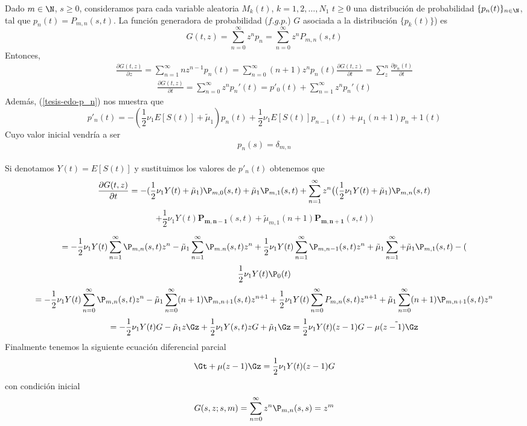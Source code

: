Dado $m\in\N$, $s\geq 0$, consideramos para cada variable aleatoria $M_k(t)$, $k=1,2,\ldots,N_1$ $t\geq 0$ una distribución de probabilidad $\{p_n(t)\}_{n\in\N}$, tal que $p_n(t)=P_{m,n}(s,t)$. La función generadora de probabilidad ($f.g.p.$) $G$ asociada a la distribución $\{p_k(t)\}$) es
\begin{equation}
    G(t,z)=\sum_{n=0}^\infty z^n p_n=\sum_{n=0}^\infty z^n P_{m,n}(s,t)\label{tesis-funcGeneradoraDeM}
\end{equation}
Entonces,
\begin{eqnarray}
    \frac{\partial G(t,z)}{\partial z}=\sum_{n=1}^\infty n z^{n-1}p_n(t)=\sum_{n=0}^\infty (n+1)z^{n}p_n(t)
    \frac{\partial G(t,z)}{\partial t} = \sum_z^n \frac{\partial p_n(t)}{\partial t}
\end{eqnarray}
\begin{eqnarray}
    \frac{\partial G(t,z)}{\partial t}=\sum_{n=0}^\infty z^n p_n'(t)=p'_0(t)+\sum_{n=1}^\infty z^n p_n'(t)
\end{eqnarray}
Además, (\ref{tesis-edo-p_n}) nos muestra que $$p'_n(t)=-(\frac{1}{2}\nu_1E[S(t)]+\tilde{\mu}_1)p_n(t)+\frac{1}{2}\nu_1E[S(t)]p_{n-1}(t)+\mu_1 (n+1)p_n+1(t)$$
Cuyo valor inicial vendría a ser $$p_n(s)=\delta_{m,n}$$\\
Si denotamos $Y(t)=E[S(t)]$ y sustituimos los valores de $p'_n(t)$ obtenemos que $$\frac{\partial G(t,z)}{\partial t} =-(\frac{1}{2}\nu_1Y(t)+\tilde{\mu}_1)\P_{m,0}(s,t)+\tilde{\mu}_1 \P_{m,1}(s,t)+\sum_{n=1}^\infty z^n\big((\frac{1}{2}\nu_1Y(t)+\tilde{\mu}_1)\P_{m,n}(s,t)$$$$+\frac{1}{2}\nu_1Y(t)\mathbf{P_{m,n-1}}(s,t)+\tilde{\mu}_{m,1} (n+1)\mathbf{P_{m,n+1}}(s,t)\big)$$

$$=-\frac{1}{2}\nu_1Y(t)\sum_{n=1}^\infty\P_{m,n}(s,t)z^n-\tilde{\mu}_1\sum_{n=1}^\infty\P_{m.n}(s,t)z^n+\frac{1}{2}\nu_1Y(t)\sum_{n=1}^\infty\P_{m,n-1}(s,t)z^n+\tilde{\mu}_1\sum_{n=1}^\infty+\tilde{\mu}_1\P_{m,1}(s,t)-($$$$\frac{1}{2}\nu_1Y(t)\P_0(t)$$
$$=-\frac{1}{2}\nu_1Y(t)\sum_{n=0}^\infty\P_{m,n}(s,t)z^n-\tilde{\mu}_1\sum_{n=0}^\infty (n+1)\P_{m,n+1}(s,t)z^{n+1}+\frac{1}{2}\nu_1Y(t)\sum_{n=0}^\infty P_{m,n}(s,t)z^{n+1}+\tilde{\mu}_1\sum_{n=0}^\infty(n+1)\P_{m,n+1}(s,t)z^n$$
$$=-\frac{1}{2}\nu_1Y(t)G-\tilde{\mu}_1z\Gz+\frac{1}{2}\nu_1Y(s,t)z G+\tilde{\mu}_1\Gz=\frac{1}{2}\nu_1Y(t)(z-1)G-\tilde{\mu(z-1)\Gz}$$
Finalmente tenemos la siguiente ecuación diferencial parcial
$$ \Gt+\mu(z-1)\Gz=\frac{1}{2}\nu_1Y(t)(z-1)G$$
con condición inicial
$$G(s,z;s,m)=\sum_{n=0}^\infty z^n\P_{m,n}(s,s)=z^m$$
